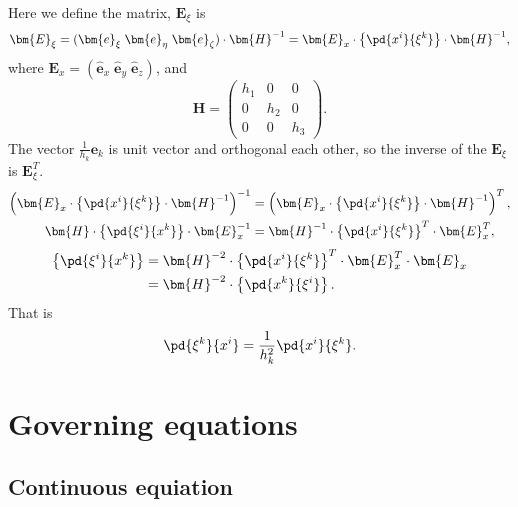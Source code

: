Here we define the matrix, $\bm{E}_\xi$ is
\begin{equation}
  \bm{E}_\xi =
  (\bm{e}_\xi \; \bm{e}_\eta \; \bm{e}_\zeta)\cdot \bm{H}^{-1}
  = \bm{E}_x \cdot \left\{\pd{x^i}{\xi^k}\right\} \cdot \bm{H}^{-1},
\end{equation}
where $\bm{E}_x = (\bm{\hat{e}}_x \; \bm{\hat{e}}_y \; \bm{\hat{e}}_z)$, and
\begin{equation}
  \bm{H} = \left(\begin{array}{ccc} h_1 & 0 & 0\\ 0 & h_2 & 0\\ 0 & 0 & h_3\end{array}\right).
\end{equation}
The vector $\frac{1}{h_k}\bm{e}_k$ is unit vector and orthogonal each other,
so the inverse of the $\bm{E}_\xi$ is $\bm{E}_\xi^T$.
\begin{align}
  \left( \bm{E}_x \cdot \left\{\pd{x^i}{\xi^k}\right\} \cdot \bm{H}^{-1} \right)^{-1} &= \left( \bm{E}_x \cdot \left\{\pd{x^i}{\xi^k}\right\} \cdot \bm{H}^{-1} \right)^T, \nonumber\\
  \bm{H} \cdot \left\{\pd{\xi^i}{x^k}\right\} \cdot \bm{E}_x^{-1} &= \bm{H}^{-1} \cdot \left\{\pd{x^i}{\xi^k}\right\}^T \cdot \bm{E}_x^T, \nonumber
\end{align}
\begin{align}
  \left\{\pd{\xi^i}{x^k}\right\} &= \bm{H}^{-2} \cdot \left\{\pd{x^i}{\xi^k}\right\}^T \cdot \bm{E}_x^T \cdot \bm{E}_x \nonumber \\
  &= \bm{H}^{-2} \cdot \left\{\pd{x^k}{\xi^i}\right\}.
\end{align}
That is
\begin{equation}
  \pd{\xi^k}{x^i} = \frac{1}{h_k^2} \pd{x^i}{\xi^k}.
\end{equation}


\section{Governing equations}

\subsection{Continuous equiation}


